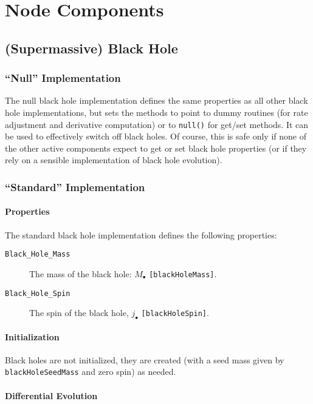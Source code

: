 \chapter{Node Components}

\section{(Supermassive) Black Hole}

\subsection{``Null'' Implementation}

The null black hole implementation defines the same properties as all other black hole implementations, but sets the methods to point to dummy routines (for rate adjustment and derivative computation) or to {\tt null()} for get/set methods. It can be used to effectively switch off black holes. Of course, this is safe only if none of the other active components expect to get or set black hole properties (or if they rely on a sensible implementation of black hole evolution).

\subsection{``Standard'' Implementation}

\subsubsection{Properties}

The standard black hole implementation defines the following properties:
\begin{description}
 \item [{\tt Black\_Hole\_Mass}] The mass of the black hole: $M_\bullet$ {\tt [blackHoleMass]}.
 \item [{\tt Black\_Hole\_Spin}] The spin of the black hole, $j_\bullet$ {\tt [blackHoleSpin]}.
\end{description}

\subsubsection{Initialization}

Black holes are not initialized, they are created (with a seed mass given by {\tt blackHoleSeedMass} and zero spin) as needed.

\subsubsection{Differential Evolution}

